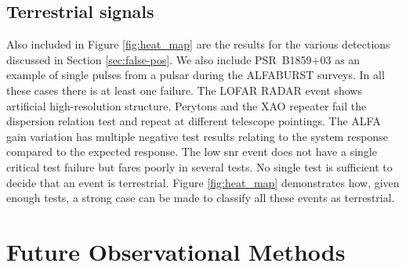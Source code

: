\documentclass[a4paper,fleqn,usenatbib]{mnras}
\newcommand{\cM}[1]{\textcolor{magenta}{ #1 --M}}
\begin{document}
%

\subsection{Terrestrial signals}

Also included in Figure \ref{fig:heat_map} are the results for the various
detections discussed in Section \ref{sec:false-pos}. We also include
PSR~B1859+03 as an example of single pulses from a pulsar during the ALFABURST
surveys.  In all these cases there is at least one failure.  The LOFAR RADAR
event shows artificial high-resolution structure.  Perytons and the XAO repeater
fail the dispersion relation test and repeat at different telescope pointings.
The ALFA gain variation has multiple negative test results relating to the
system response compared to the expected response.  The low \gls{snr} event does
not have a single critical test failure but fares poorly in several tests.  No
single test is sufficient to decide that an event is terrestrial. Figure
\ref{fig:heat_map} demonstrates how, given enough tests, a strong case can be
made to classify all these events as terrestrial.

\section{Future Observational Methods}
\end{document}
